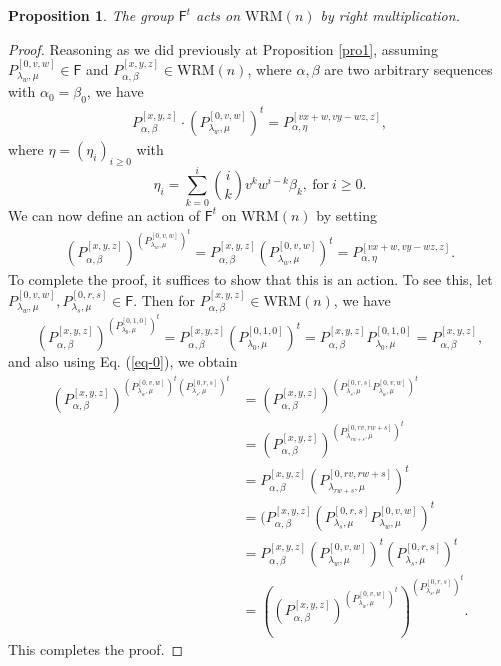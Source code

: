 \documentclass{amsart}
\newtheorem{pro}{Proposition}
\begin{document}
\begin{pro}\label{pro2} The group $\mathsf {F}^t$ acts on $\mathrm{WRM}(n)$ by right multiplication.
\end{pro}
\begin{proof} Reasoning as we did previously at Proposition \ref{pro1}, assuming 
$P_{\lambda_w, \mu}^{[0, v, w]}\in \mathsf {F}$ and $P_{\alpha, \beta}^{[x, y, z]}\in \mathrm{WRM}(n)$, where $\alpha, \beta$ are two arbitrary sequences with $\alpha_0=\beta_0$, we have  
\begin{align}\label{eq7}
P_{\alpha, \beta}^{[x, y, z]}\cdot (P_{\lambda_w, \mu}^{[0, v, w]})^t=P^{[vx+w, vy-wz, z]}_{\alpha, \eta},
\end{align}
where $\eta=(\eta_i)_{i\geq 0}$ with 
$$\eta_i= \sum_{k=0}^{i} \binom{i}{k} v^k  w^{i-k} \beta_{k},  \ \text{for} \  i\geq 0.$$
We can now define an action of $\mathsf {F}^t$ on $\mathrm{WRM}(n)$ by setting 
\begin{align*}(P_{\alpha, \beta}^{[x, y, z]})^{(P_{\lambda_w, \mu}^{[0, v, w]})^t}=P_{\alpha, \beta}^{[x, y, z]} (P_{\lambda_w, \mu}^{[0, v, w]})^{t}=P^{[vx+w, vy-wz, z]}_{\alpha, \eta}.\end{align*}
To complete the proof, it suffices to show that this is an action. To see this, let $P_{\lambda_w, \mu}^{[0, v, w]}, P_{\lambda_s, \mu}^{[0, r, s]}\in \mathsf {F}$. Then for $P_{\alpha, \beta}^{[x, y, z]}\in \mathrm{WRM}(n)$, we have 
$$(P_{\alpha, \beta}^{[x, y, z]})^{(P_{\lambda_{0}, {\mu}}^{[0, 1, 0]})^t}=P_{\alpha, \beta}^{[x, y, z]}(P_{\lambda_{0}, {\mu}}^{[0, 1, 0]} )^{t}=P_{\alpha, \beta}^{[x, y, z]}P_{\lambda_{0}, {\mu}}^{[0, 1, 0]} =P^{[x,  y, z]}_{\alpha, \beta},$$ and also using Eq. (\ref{eq-0}), we obtain
\begin{align*} (P_{\alpha, \beta}^{[x, y, z]})^{(P_{\lambda_w, \mu}^{[0, v, w]})^t (P_{\lambda_s, \mu}^{[0, r, s]})^t}&=(P_{\alpha, \beta}^{[x, y, z]})^{(P_{\lambda_s, \mu}^{[0, r, s]} P_{\lambda_w, \mu}^{[0, v, w]})^t}\\
& =(P_{\alpha, \beta}^{[x, y, z]})^{(P_{\lambda_{rw+s}, \mu}^{[0, rv, rw+s]})^t}\\ 
&= P_{\alpha, \beta}^{[x, y, z]} (P_{\lambda_{rw+s}, \mu}^{[0, rv, rw+s]})^t\\
&= (P_{\alpha, \beta}^{[x, y, z]}(P_{\lambda_s, \mu}^{[0, r, s]} P_{\lambda_w, \mu}^{[0, v, w]})^t\\
&= P_{\alpha, \beta}^{[x, y, z]} (P_{\lambda_w, \mu}^{[0, v, w]})^t (P_{\lambda_s, \mu}^{[0, r, s]})^t \\
&=\left((P_{\alpha, \beta}^{[x, y, z]})^{(P_{\lambda_w, \mu}^{[0, v, w]})^t}\right)^{(P_{\lambda_s, \mu}^{[0, r, s]})^t}.
\end{align*}
This completes the proof. \end{proof}
\end{document}
